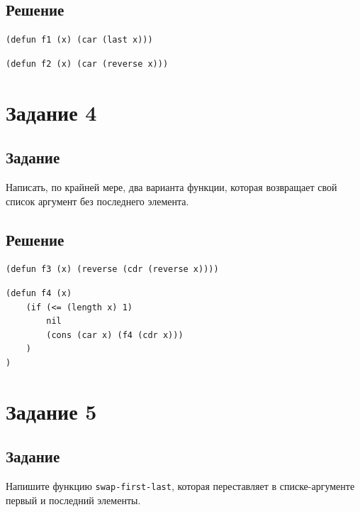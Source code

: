\subsection*{Решение}
\begin{code}
\begin{verbatim}
(defun f1 (x) (car (last x)))
\end{verbatim}
\end{code}

\begin{code}
\begin{verbatim}
(defun f2 (x) (car (reverse x)))
\end{verbatim}
\end{code}


\section{Задание 4}
\subsection*{Задание}
Написать, по крайней мере, два варианта функции, которая возвращает свой список аргумент без последнего элемента.

\subsection*{Решение}
\begin{code}
\begin{verbatim}
(defun f3 (x) (reverse (cdr (reverse x))))
\end{verbatim}
\end{code}

\begin{code}
\begin{verbatim}
(defun f4 (x) 
	(if (<= (length x) 1)
		nil
		(cons (car x) (f4 (cdr x)))	
	)
)
\end{verbatim}
\end{code}


\section{Задание 5}
\subsection*{Задание}
Напишите функцию \texttt{swap-first-last}, которая переставляет в списке-аргументе первый и последний элементы.

